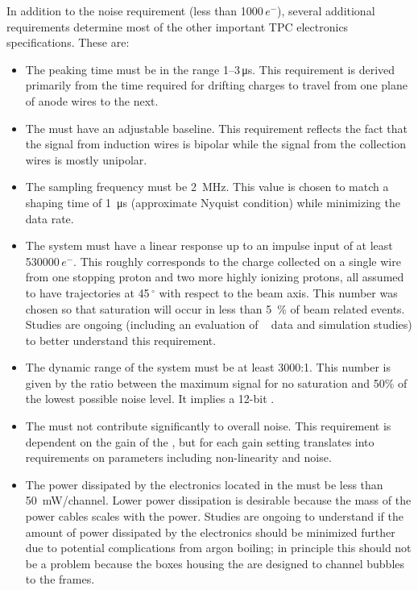 In addition to the noise requirement (less than \num{1000}\,$e^{-}$), several additional requirements determine most of the other important TPC electronics specifications.  These are:

\begin{itemize}
\item{The  peaking time must  %
be  in the range \numrange{1}{3}\,\si{\micro\second}.  This requirement is derived primarily from the time required for drifting charges to travel from one plane of anode wires to the next.}
\item{The  must %
 have an adjustable baseline.  This requirement reflects the fact that the signal from induction wires is bipolar while the signal from the collection wires is mostly unipolar.}
\item{The  sampling frequency must %
be \SI{2}{MHz}.  This value is chosen to match a  shaping time of \SI{1}{\micro\second} (approximate Nyquist condition) while minimizing the data rate.}
\item{The system must 
have a linear response up to an impulse input of at least \num{530000}\,$e^{-}$.  This roughly corresponds to the charge collected on a single wire from one stopping proton and two more highly ionizing protons, all assumed to have trajectories at \num{45}\,$^{\circ}$ with respect to the beam axis.  This number was chosen so that saturation will occur in less than \SI{5}{\%} of beam related events.  Studies are ongoing (including an evaluation of \lariat~\cite{Cavanna:2014iqa} data and simulation studies) to better understand this requirement.}
\item{The dynamic range of the system must be at least \num{3000}:\num{1}. This number is given by the ratio between the maximum signal for no saturation and 50\% of the lowest possible noise level.  It implies a \num{12}-bit .}
\item{The  must not contribute significantly to overall  noise. This requirement is dependent on the gain of the , but for each gain setting translates into requirements on  parameters including non-linearity and noise.}
\item{The power dissipated by the electronics located in the \lar must 
be less than \SI{50}{mW/channel}.  Lower power dissipation is desirable because the mass of the power cables scales with the power.  Studies are ongoing to understand if the amount of power dissipated by the electronics should be minimized further due to potential complications from argon boiling; in principle this should not be a problem because the  boxes housing the  are designed to channel bubbles to the  frames.}
\end{itemize}

